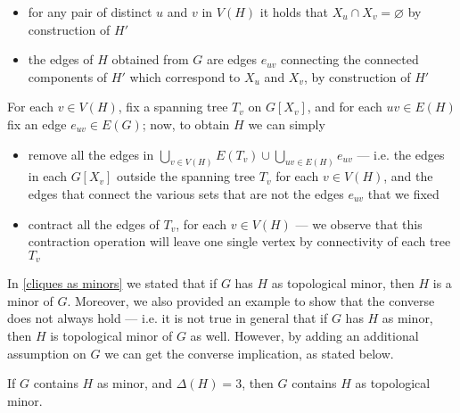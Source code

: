 \documentclass[a4paper, 12pt]{report}
\begin{document}
{        \begin{itemize}
            \item for any pair of distinct $u$ and $v$ in $V(H)$ it holds that $X_u \cap X_v = \varnothing$ by construction of $H'$
            \item the edges of $H$ obtained from $G$ are edges $e_{uv}$ connecting the connected components of $H'$ which correspond to $X_u$ and $X_v$, by construction of $H'$
        \end{itemize}
    }{
        For each $v \in V(H)$, fix a spanning tree $T_v$ on $G[X_v]$, and for each $uv \in E(H)$ fix an edge $e_{uv} \in E(G)$; now, to obtain $H$ we can simply

        \begin{itemize}
            \item remove all the edges  in $\displaystyle \bigcup_{v \in V(H)}{E(T_v)} \cup \bigcup_{uv \in E(H)}{e_{uv}}$ --- i.e. the edges in each $G[X_v]$ outside the spanning tree $T_v$ for each $v \in V(H)$, and the edges that connect the various sets that are not the edges $e_{uv}$ that we fixed
            \item contract all the edges of $T_v$, for each $v \in V(H)$ --- we observe that this contraction operation will leave one single vertex by connectivity of each tree $T_v$
        \end{itemize}
    }

    In \cref{cliques as minors} we stated that if $G$ has $H$ as topological minor, then $H$ is a minor of $G$. Moreover, we also provided an example to show that the converse does not always hold --- i.e. it is not true in general that if $G$ has $H$ as minor, then $H$ is topological minor of $G$ as well. However, by adding an additional assumption on $G$ we can get the converse implication, as stated below.

    \begin{framedprop}{}
        If $G$ contains $H$ as minor, and $\Delta(H) = 3$, then $G$ contains $H$ as topological minor.
    \end{framedprop}
\end{document}
